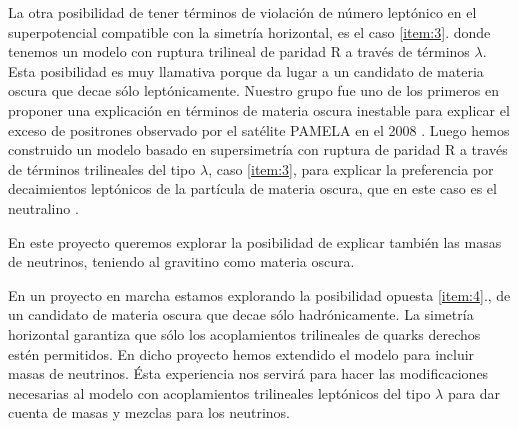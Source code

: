 La otra posibilidad de tener términos de violación de número leptónico
en el superpotencial compatible con la simetría horizontal, es el caso
\ref{item:3}. donde tenemos un modelo con ruptura trilineal de paridad
R a través de términos $\lambda$. Esta posibilidad es muy llamativa
porque da lugar a un candidato de materia oscura que decae sólo
leptónicamente. Nuestro grupo \cite{Nardi:2008ix} fue uno de los
primeros en proponer una explicación en términos de materia oscura
inestable para explicar el exceso de positrones observado por el
satélite PAMELA en el 2008 \cite{Adriani:2008zr}. Luego hemos
construido un modelo basado en supersimetría con ruptura de paridad R
a través de términos trilineales del tipo $\lambda$, caso
\ref{item:3}, para explicar la preferencia por decaimientos leptónicos
de la partícula de materia oscura, que en este caso es el
neutralino \cite{Sierra:2009zq}.
\begin{proyecto}
  En este proyecto queremos explorar la posibilidad de explicar
  también las masas de neutrinos, teniendo al gravitino como materia
  oscura.
\end{proyecto}
En un proyecto en marcha estamos explorando la posibilidad opuesta
\ref{item:4}., de un candidato de materia oscura que decae sólo
hadrónicamente. La simetría horizontal garantiza que sólo los
acoplamientos trilineales de quarks derechos estén permitidos. En
dicho proyecto hemos extendido el modelo para incluir masas de
neutrinos. Ésta experiencia nos servirá para hacer las modificaciones
necesarias al modelo con acoplamientos trilineales leptónicos del tipo
$\lambda$ para dar cuenta de masas y mezclas para los neutrinos.


